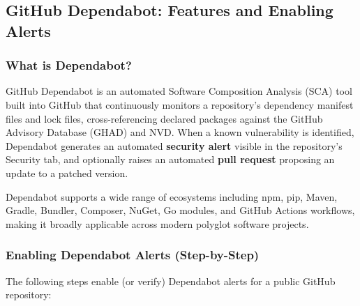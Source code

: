 \documentclass[12pt,a4paper]{article}
\begin{document}
\subsection{GitHub Dependabot: Features and Enabling Alerts}

\subsubsection*{What is Dependabot?}

GitHub Dependabot \citep{ghDependabot} is an automated Software Composition Analysis
(SCA) tool built into GitHub that continuously monitors a repository's dependency manifest
files and lock files, cross-referencing declared packages against the GitHub Advisory
Database (GHAD) and NVD. When a known vulnerability is identified, Dependabot generates
an automated \textbf{security alert} visible in the repository's Security tab, and
optionally raises an automated \textbf{pull request} proposing an update to a patched
version.

Dependabot supports a wide range of ecosystems including npm, pip, Maven, Gradle, Bundler,
Composer, NuGet, Go modules, and GitHub Actions workflows, making it broadly applicable
across modern polyglot software projects.

\subsubsection*{Enabling Dependabot Alerts (Step-by-Step)}

The following steps enable (or verify) Dependabot alerts for a public GitHub repository:
\end{document}

